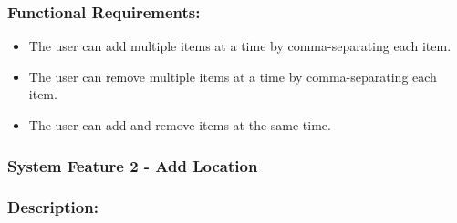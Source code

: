 \documentclass[10pt,twocolumn]{witseiepaper}
\begin{document}
		\subsubsection*{Functional Requirements:}
		
		\begin{itemize}
			\item The user can add multiple items at a time by comma-separating each item.
			\item The user can remove multiple items at a time by comma-separating each item.
			\item The user can add and remove items at the same time.
		\end{itemize}
		
		
		\subsubsection{System Feature 2 - Add Location}
		
		\subsubsection*{Description:}
		
\end{document}
